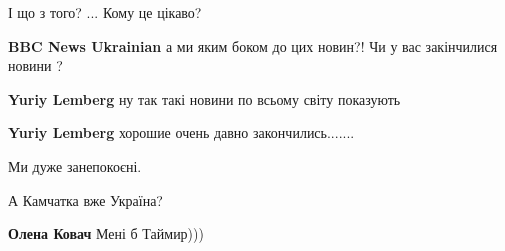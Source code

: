\begin{itemize}
І що з того? ... Кому це цікаво?

 
\textbf{BBC News Ukrainian} а ми яким боком до цих новин?! Чи у вас закінчилися новини ?


\begin{itemize}
 
\textbf{Yuriy Lemberg} ну так такі новини по всьому світу показують

 
\textbf{Yuriy Lemberg} хорошие очень давно закончились.......
\end{itemize}

 
Ми дуже занепокоєні.

 
А Камчатка вже Україна?

\begin{itemize}
 
\textbf{Олена Ковач} Мені б Таймир)))

\begin{itemize}

 

\end{itemize}
\end{itemize}
\end{itemize}
